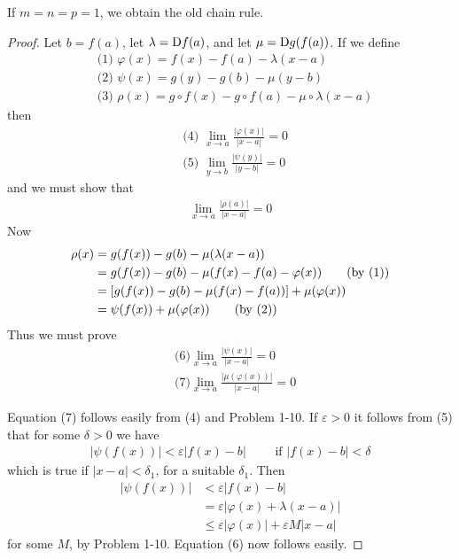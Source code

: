 If $m=n=p=1$, we obtain the old chain rule.
\begin{proof}
    Let $b = f(a)$, let $\lambda = \mathrm{D}f(a)$, and let $\mu = \mathrm{D}g(f(a))$.
    If we define 
    \begin{align*}
        & \text{(1) }\varphi(x) = f(x) - f(a) - \lambda(x-a) \\
        & \text{(2) }\psi(x) = g(y) - g(b) - \mu(y-b)\\
        & \text{(3) }\rho(x) = g\circ f(x) - g\circ f(a) - \mu\circ \lambda(x-a)
    \end{align*}\relax
    then 
    \begin{align*}
        & \text{(4) } \displaystyle\lim_{x\to a}{\frac{|\varphi(x)|}{|x-a|}} = 0\\
        & \text{(5) } \displaystyle\lim_{y\to b}{\frac{|\psi(y)|}{|y-b|}} = 0
    \end{align*}
    and we must show that 
    \begin{align*}
        \lim_{x\to a}{\frac{|\rho(a)|}{|x-a|}} = 0
    \end{align*}\relax
    Now 
    \begin{align*}
        \rho(x) 
        & = g(f(x)) - g(b) - \mu(\lambda(x-a)) \\
        & = g(f(x)) - g(b) -\mu(f(x) - f(a) - \varphi(x))   \tag{\text{by (1)}} \\
        & = \left[g(f(x)) - g(b) - \mu(f(x) - f(a))\right] + \mu(\varphi(x)) \\
        & = \psi(f(x)) + \mu(\varphi(x))    \tag{\text{by (2)}}
    \end{align*}\relax 
    Thus we must prove
    \begin{align*}
        & \text{(6)} \lim_{x\to a}{\frac{|\psi(x)|}{|x-a|}} = 0 \\
        & \text{(7)} \lim_{x\to a}{\frac{|\mu(\varphi(x))|}{|x-a|}} = 0
    \end{align*}

    Equation (7) follows easily from (4) and Problem 1-10. If $\varepsilon>0$ it follows
    from (5) that for some $\delta >0$ we have 
    \begin{align*}
        \left|\psi(f(x))\right| < \varepsilon|f(x) - b| \qquad \text{ if } |f(x)-b|<\delta 
    \end{align*}\relax 
    which is true if $|x-a| < \delta_1$, for a suitable $\delta_1$. Then 
    \begin{align*}
        \left|\psi(f(x))\right| 
        & < \varepsilon|f(x)- b| \\
        & = \varepsilon|\varphi(x) + \lambda(x-a)| \\
        & \le \varepsilon|\varphi(x)| + \varepsilon M|x-a|
    \end{align*} 
    for some $M$, by Problem 1-10. Equation (6) now follows easily.
\end{proof}


